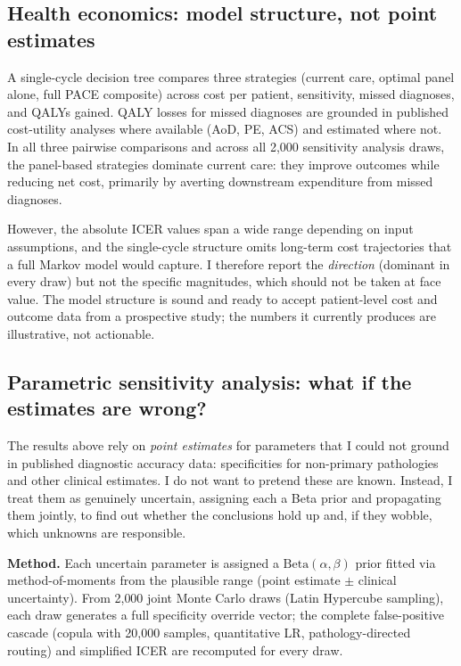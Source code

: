 \documentclass[11pt, oneside]{article}
\begin{document}
\subsection{Health economics: model structure, not point estimates}

A single-cycle decision tree compares three strategies (current care, optimal panel alone, full PACE composite) across cost per patient, sensitivity, missed diagnoses, and QALYs gained. QALY losses for missed diagnoses are grounded in published cost-utility analyses where available (AoD, PE, ACS) and estimated where not. In all three pairwise comparisons and across all 2{,}000 sensitivity analysis draws, the panel-based strategies dominate current care: they improve outcomes while reducing net cost, primarily by averting downstream expenditure from missed diagnoses.

However, the absolute ICER values span a wide range depending on input assumptions, and the single-cycle structure omits long-term cost trajectories that a full Markov model would capture. I therefore report the \emph{direction} (dominant in every draw) but not the specific magnitudes, which should not be taken at face value. The model structure is sound and ready to accept patient-level cost and outcome data from a prospective study; the numbers it currently produces are illustrative, not actionable.

\subsection{Parametric sensitivity analysis: what if the estimates are wrong?}
\label{sec:sensitivity_analysis}

The results above rely on \emph{point estimates} for parameters that I could not ground in published diagnostic accuracy data: specificities for non-primary pathologies and other clinical estimates. I do not want to pretend these are known. Instead, I treat them as genuinely uncertain, assigning each a Beta prior and propagating them jointly, to find out whether the conclusions hold up and, if they wobble, which unknowns are responsible.

\textbf{Method.} Each uncertain parameter is assigned a $\text{Beta}(\alpha, \beta)$ prior fitted via method-of-moments from the plausible range (point estimate $\pm$ clinical uncertainty). From 2{,}000 joint Monte Carlo draws (Latin Hypercube sampling), each draw generates a full specificity override vector; the complete false-positive cascade (copula with 20{,}000 samples, quantitative LR, pathology-directed routing) and simplified ICER are recomputed for every draw.
\end{document}
